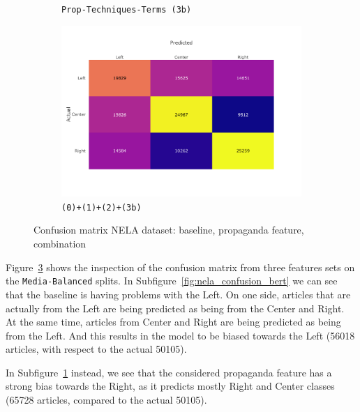 \begin{figure}[!htb]
\begin{subfigure}[b]{0.48\linewidth}
         \caption{\texttt{Prop-Techniques-Terms (3b)}}
         \label{fig:nela_confusion_prop}
     \end{subfigure}
    \begin{subfigure}[b]{0.48\linewidth}
         \centering 
         \includegraphics[trim={0 2cm 2cm 1cm},clip,width=\linewidth]{figures/nela_allsides_subset_media_balanced_confusion_matrix_bert,propaganda_total_percentage,propaganda_percentages,propaganda_techniques_tf_idf.pdf}
         \caption{\texttt{(0)+(1)+(2)+(3b)}}
         \label{fig:nela_confusion_combined}
     \end{subfigure}
    \caption{Confusion matrix NELA dataset: baseline, propaganda feature, combination}
    \label{fig:nela_confusion}
\end{figure}

Figure~\ref{fig:nela_confusion} shows the inspection of the confusion matrix from three features sets on the \texttt{Media-Balanced} splits.
In Subfigure~\ref{fig:nela_confusion_bert} we can see that the baseline is having problems with the Left.
On one side, articles that are actually from the Left are being predicted as being from the Center and Right.
At the same time, articles from Center and Right are being predicted as being from the Left. And this results in the model to be biased towards the Left (56018 articles, with respect to the actual 50105).

In Subfigure~\ref{fig:nela_confusion_prop} instead, we see that the considered propaganda feature has a strong bias towards the Right, as it predicts mostly Right and Center classes (65728 articles, compared to the actual 50105).

